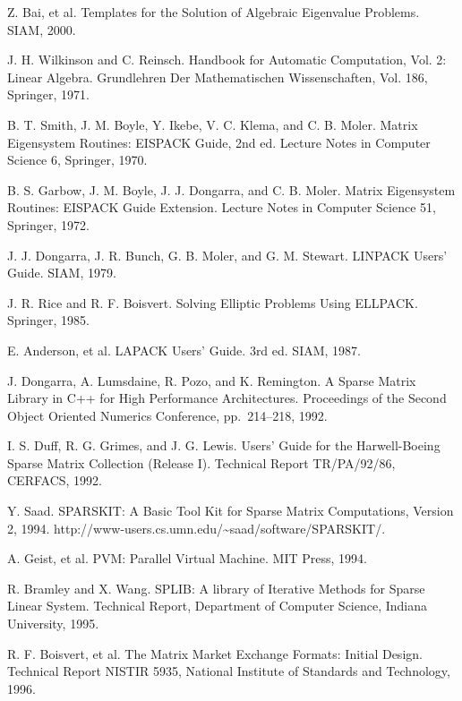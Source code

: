 \documentclass[a4paper]{jarticle}
\begin{document}
{{\begin{thebibliography}{10}
Z. Bai, et al.
\newblock Templates for the Solution of Algebraic Eigenvalue Problems. 
\newblock SIAM, 2000.

J. H. Wilkinson and C. Reinsch.
\newblock Handbook for Automatic Computation, Vol. 2: Linear Algebra.
\newblock Grundlehren Der Mathematischen Wissenschaften, Vol. 186, Springer, 1971.

B. T. Smith, J. M. Boyle, Y. Ikebe, V. C. Klema, and C. B. Moler.
\newblock Matrix Eigensystem Routines: EISPACK Guide, 2nd ed.
\newblock Lecture Notes in Computer Science 6, Springer, 1970.

B. S. Garbow, J. M. Boyle, J. J. Dongarra, and C. B. Moler.
\newblock Matrix Eigensystem Routines: EISPACK Guide Extension.
\newblock Lecture Notes in Computer Science 51, Springer, 1972.

J. J. Dongarra, J. R. Bunch, G. B. Moler, and G. M. Stewart.
\newblock LINPACK Users' Guide.
\newblock SIAM, 1979.

J. R. Rice and R. F. Boisvert.
\newblock Solving Elliptic Problems Using ELLPACK.
\newblock Springer, 1985.

E. Anderson, et al. 
\newblock LAPACK Users' Guide. 3rd ed.
\newblock SIAM, 1987.

J. Dongarra, A. Lumsdaine, R. Pozo, and K. Remington.
\newblock A Sparse Matrix Library in C++ for High Performance Architectures.
\newblock Proceedings of the Second Object Oriented Numerics Conference,
	pp.\ 214--218, 1992.

I. S. Duff, R. G. Grimes, and J. G. Lewis.
\newblock Users' Guide for the Harwell-Boeing Sparse Matrix Collection
(Release I).
\newblock Technical Report TR/PA/92/86, CERFACS, 1992.

Y. Saad.
\newblock SPARSKIT: A Basic Tool Kit for Sparse Matrix Computations,
  Version 2, 1994.
\newblock http://www-users.cs.umn.edu/\textasciitilde saad/software/SPARSKIT/.

A. Geist, et al.
\newblock PVM: Parallel Virtual Machine.
\newblock MIT Press, 1994.

R. Bramley and X. Wang.
\newblock SPLIB: A library of Iterative Methods for Sparse Linear System.
\newblock Technical Report, Department of Computer Science, Indiana University, 1995.

R. F. Boisvert, et al. 
\newblock The Matrix Market Exchange Formats: Initial Design. 
\newblock Technical Report NISTIR 5935, National Institute of Standards and
	Technology, 1996.


\end{thebibliography}}}
\end{document}
